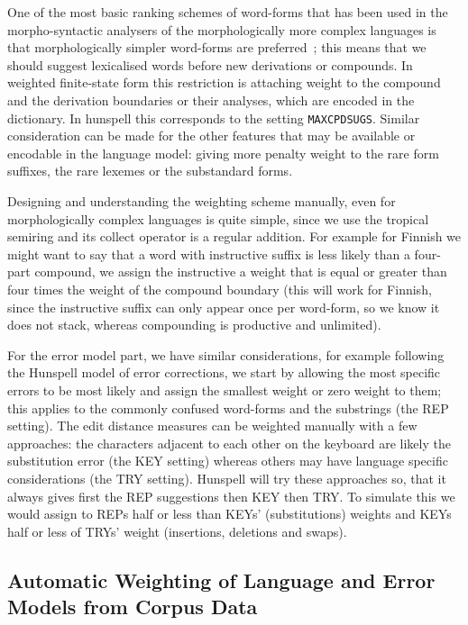\documentclass[a4paper,12pt]{article}
\begin{document}
One of the most basic ranking schemes of word-forms that has been used in the
morpho-syntactic analysers of the morphologically more complex languages is
that morphologically simpler word-forms are
preferred~\cite[]{karlsson1992swetwol}; this means that we should suggest
lexicalised words before new derivations or compounds.  In weighted
finite-state form this restriction is attaching weight to the compound and the
derivation boundaries or their analyses, which are encoded in the dictionary.
In hunspell this corresponds to the setting \texttt{MAXCPDSUGS}. Similar
consideration can be made for the other features that may be available or
encodable in the language model: giving more penalty weight to the rare form
suffixes, the rare lexemes or the substandard forms.

Designing and understanding the weighting scheme manually, even for
morphologically complex languages is quite simple, since we use the tropical
semiring and its collect operator is a regular addition. For example for
Finnish we might want to say that a word with instructive suffix is less likely
than a four-part compound, we assign the instructive a weight that is equal or
greater than four times the weight of the compound boundary (this will work for
Finnish, since the instructive suffix can only appear once per word-form, so we
know it does not stack, whereas compounding is productive and unlimited).

For the error model part, we have similar considerations, for example
following the Hunspell model of error corrections, we start by allowing the
most specific errors to be most likely and assign the smallest weight or zero
weight to them; this applies to the commonly confused word-forms and the
substrings (the REP setting). The edit distance measures can be weighted
manually with a few approaches: the characters adjacent to each other on the
keyboard are likely the substitution error (the KEY setting) whereas others
may have language specific considerations (the TRY setting).  Hunspell will try
these approaches so, that it always gives first the REP suggestions then KEY
then TRY. To simulate this we would assign to REPs half or less than KEYs'
(substitutions) weights and KEYs half or less of TRYs' weight (insertions,
deletions and swaps).

\subsection{Automatic Weighting of Language and Error Models from Corpus Data}
\label{subsec:automatic-weighting}
\end{document}
